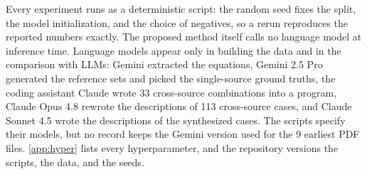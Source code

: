 Every experiment runs as a deterministic script: the random seed fixes the split, the model
initialization, and the choice of negatives, so a rerun reproduces the reported numbers exactly.
The proposed method itself calls no language model at inference time. Language models appear only
in building the data and in the comparison with LLMs: Gemini extracted the equations, Gemini 2.5
Pro generated the reference sets and picked the single-source ground truths, the coding assistant
Claude wrote 33 cross-source combinations into a program, Claude Opus 4.8 rewrote the descriptions
of 113 cross-source cases, and Claude Sonnet 4.5 wrote the descriptions of the synthesized cases. The scripts specify their models, but no record keeps the
Gemini version used for the 9 earliest PDF files. \ref{app:hyper} lists every hyperparameter,
and the repository versions the scripts, the data, and the seeds.
